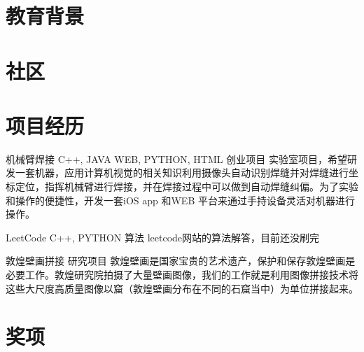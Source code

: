 \documentclass[11pt,a4paper]{moderncv}
\title{}               %
\begin{document}
\maketitle

\section{教育背景}
 {}{} %


\section{社区}

\section{项目经历}
\renewcommand{\baselinestretch}{1.1}

{机械臂焊接}
{C++, JAVA WEB, PYTHON, HTML}
{创业项目}{}
{实验室项目，希望研发一套机器，应用计算机视觉的相关知识利用摄像头自动识别焊缝并对焊缝进行坐标定位，指挥机械臂进行焊接，并在焊接过程中可以做到自动焊缝纠偏。为了实验和操作的便捷性，开发一套iOS app 和WEB 平台来通过手持设备灵活对机器进行操作。}

\vspace*{0.2\baselineskip}
{LeetCode}
{C++, PYTHON}
{算法}{}
{leetcode网站的算法解答，目前还没刷完}

\vspace*{0.2\baselineskip}
{敦煌壁画拼接}{}
{研究项目}{}
{敦煌壁画是国家宝贵的艺术遗产，保护和保存敦煌壁画是必要工作。敦煌研究院拍摄了大量壁画图像，我们的工作就是利用图像拼接技术将这些大尺度高质量图像以窟（敦煌壁画分布在不同的石窟当中）为单位拼接起来。}

\section{奖项}
\end{document}
